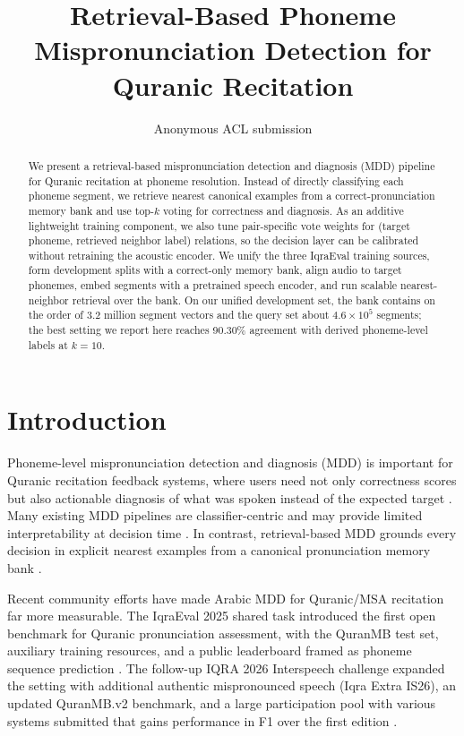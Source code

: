 \documentclass[11pt]{article}
\title{Retrieval-Based Phoneme Mispronunciation Detection for Quranic Recitation}
\author{Anonymous ACL submission}
\begin{document}
\maketitle
\begin{abstract}
We present a retrieval-based mispronunciation detection and diagnosis (MDD) pipeline for Quranic recitation at phoneme resolution.
Instead of directly classifying each phoneme segment, we retrieve nearest canonical examples from a correct-pronunciation memory bank and use top-$k$ voting for correctness and diagnosis. As an additive lightweight training component, we also tune pair-specific vote weights for (target phoneme, retrieved neighbor label) relations, so the decision layer can be calibrated without retraining the acoustic encoder.
We unify the three IqraEval training sources, form development splits with a correct-only memory bank, align audio to target phonemes, embed segments with a pretrained speech encoder, and run scalable nearest-neighbor retrieval over the bank.
On our unified development set, the bank contains on the order of $3.2$ million segment vectors and the query set about $4.6\times 10^5$ segments; the best setting we report here reaches 90.30\% agreement with derived phoneme-level labels at $k{=}10$.
\end{abstract}

\section{Introduction}
Phoneme-level mispronunciation detection and diagnosis (MDD) is important for Quranic recitation feedback systems, where users need not only correctness scores but also actionable diagnosis of what was spoken instead of the expected target \citep{neri-etal-2008-capt,rogerson-revell-2021-capt,li-etal-2016-mdd,leung-etal-2019-cnn-rnn-ctc}.
Many existing MDD pipelines are classifier-centric and may provide limited interpretability at decision time \citep{li-etal-2016-mdd,leung-etal-2019-cnn-rnn-ctc,tu-etal-2025-per-mdd}.
In contrast, retrieval-based MDD grounds every decision in explicit nearest examples from a canonical pronunciation memory bank \citep{tu-etal-2025-per-mdd,mittal-etal-2025-recast,siskos-etal-2025-rag-asr}.

Recent community efforts have made Arabic MDD for Quranic/MSA recitation far more measurable.
The IqraEval 2025 shared task introduced the first open benchmark for Quranic pronunciation assessment, with the QuranMB test set, auxiliary training resources, and a public leaderboard framed as phoneme sequence prediction \citep{el-kheir-etal-2025-iqraeval}.
The follow-up IQRA 2026 Interspeech challenge expanded the setting with additional authentic mispronounced speech (Iqra Extra IS26), an updated QuranMB.v2 benchmark, and a large participation pool with various systems submitted that gains performance in F1 over the first edition \citep{el-kheir-etal-2026-iqra-interspeech}.
\end{document}
